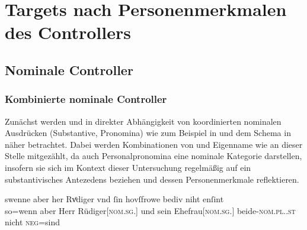 
\section{Targets nach Personenmerkmalen des Controllers}
\label{sec:caotargpers}

\subsection{Nominale Controller}
\subsubsection{Kombinierte nominale Controller}
\label{subsubsec:perscombsgnp}

Zunächst werden  und   in direkter
Abhängigkeit von koordinierten nominalen Ausdrücken
(Substantive, Pronomina) wie zum Beispiel   in 
und dem Schema in  näher betrachtet. Dabei werden
Kombinationen von  und Eigenname wie   an dieser Stelle mitgezählt, da auch
Personalpronomina eine nominale Kategorie darstellen,
insofern sie sich im Kontext dieser Untersuchung regelmäßig auf ein
substantivisches Antezedens beziehen und dessen Personenmerkmale reflektieren.

\begin{exe}
\ex \label{ex:beid2coordncao1}
		\gll swenne aber her Rvͦdiger vnd ſin
			hovſfrowe bediv niht enſint\\
			so=wenn aber Herr Rüdiger[\textsc{nom.sg.\MascM}] und sein
			Ehefrau[\textsc{nom.sg.\FemF}] beide-\textsc{nom.pl.\NeutMF.st} nicht
			\textsc{neg}=sind\\
			\trans {}
				\parencites(Nr.~3262, Regensburg, 1299)[425,13--14]{cao4}
\end{exe}

